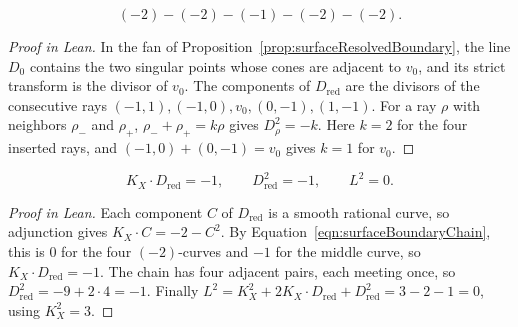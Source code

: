 \begin{equationnode}

\label{eqn:surfaceBoundaryChain}


\leanok



\begin{equation*} (-2)-(-2)-(-1)-(-2)-(-2). \end{equation*}

\end{equationnode}

\begin{proof}[Proof in Lean]

\leanok


In the fan of Proposition~\ref{prop:surfaceResolvedBoundary}, the line $D_0$ contains the two singular points whose cones are adjacent to $v_0$, and its strict transform is the divisor of $v_0$. The components of $D_{\mathrm{red}}$ are the divisors of the consecutive rays $(-1,1),(-1,0),v_0,(0,-1),(1,-1)$. For a ray $\rho$ with neighbors $\rho_-$ and $\rho_+$, $\rho_-+\rho_+=k\rho$ gives $D_\rho^2=-k$. Here $k=2$ for the four inserted rays, and $(-1,0)+(0,-1)=v_0$ gives $k=1$ for $v_0$.

\end{proof}

\begin{equationnode}

\label{eqn:surfaceLogIntersections}


\leanok



\begin{equation*} K_X\cdot D_{\mathrm{red}}=-1,\qquad D_{\mathrm{red}}^2=-1,\qquad L^2=0. \end{equation*}

\end{equationnode}

\begin{proof}[Proof in Lean]

\leanok


Each component $C$ of $D_{\mathrm{red}}$ is a smooth rational curve, so adjunction gives $K_X\cdot C=-2-C^2$. By Equation~\ref{eqn:surfaceBoundaryChain}, this is $0$ for the four $(-2)$-curves and $-1$ for the middle curve, so $K_X\cdot D_{\mathrm{red}}=-1$. The chain has four adjacent pairs, each meeting once, so $D_{\mathrm{red}}^2=-9+2\cdot4=-1$. Finally $L^2=K_X^2+2K_X\cdot D_{\mathrm{red}}+D_{\mathrm{red}}^2=3-2-1=0$, using $K_X^2=3$.

\end{proof}

